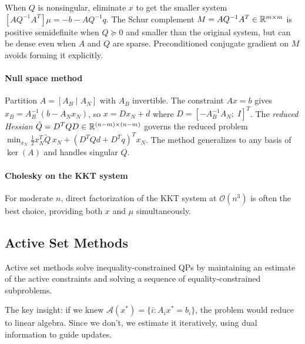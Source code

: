 When $Q$ is nonsingular, eliminate $x$ to get the smaller system $[AQ^{-1}A^T]\mu = -b - AQ^{-1}q$.
The Schur complement $M = AQ^{-1}A^T \in \mathbb{R}^{m \times m}$ is positive semidefinite when $Q \succeq 0$ and smaller than the original system, but can be dense even when $A$ and $Q$ are sparse.
Preconditioned conjugate gradient on $M$ avoids forming it explicitly.

\paragraph{Null space method}

Partition $A = [A_B \mid A_N]$ with $A_B$ invertible.
The constraint $Ax = b$ gives $x_B = A_B^{-1}(b - A_N x_N)$, so $x = Dx_N + d$ where $D = [-A_B^{-1}A_N;\; I]^T$.
The \emph{reduced Hessian} $\tilde{Q} = D^T Q D \in \mathbb{R}^{(n-m) \times (n-m)}$ governs the reduced problem $\min_{x_N} \frac{1}{2} x_N^T \tilde{Q}\, x_N + (D^T Q d + D^T q)^T x_N$.
The method generalizes to any basis of $\ker(A)$ and handles singular $Q$.

\paragraph{Cholesky on the KKT system}

For moderate $n$, direct factorization of the KKT system at $\mathcal{O}(n^3)$ is often the best choice, providing both $x$ and $\mu$ simultaneously.


\subsection{Active Set Methods}\label{sec:active-set}

Active set methods solve inequality-constrained QPs by maintaining an estimate of the active constraints and solving a sequence of equality-constrained subproblems.

The key insight: if we knew $\mathcal{A}(x^*) = \{i : A_i x^* = b_i\}$, the problem would reduce to linear algebra.
Since we don't, we estimate it iteratively, using dual information to guide updates.

